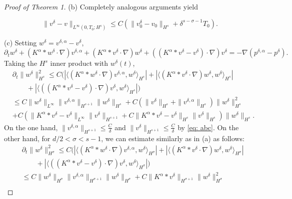 \documentclass{amsart}
\begin{document}
\begin{proof}[Proof of Theorem 1]
(b) Completely analogous arguments yield 

\begin{equation*}
 \|v^{\delta}-v\|_{L^{\infty}(0,T_0;H^s)} \leq C(\|v_0^{\delta}-v_0\|_{H^s}+\delta^{s-\sigma-1}T_0).
\end{equation*}


(c) Setting $w^{\delta}=v^{\delta, \alpha}-v^{\delta}$,
$$ \partial_t w^{\delta} + (K^{\alpha}*w^{\delta} \cdot \nabla) v^{\delta, \alpha} + (K^{\alpha}*v^{\delta} \cdot \nabla) w^{\delta}+  ((K^{\alpha}*v^{\delta}-v^{\delta}) \cdot \nabla) v^{\delta} = -\nabla (p^{\delta,\alpha}-p^{\delta}).$$
Taking the $H^s$ inner product with $w^{\delta}(t)$,
\begin{equation*}
\begin{aligned}
&\partial_t \|w^{\delta} \|_{H^s}^2 \leq C(|\langle (K^{\alpha}*w^{\delta} \cdot \nabla) v^{\delta, \alpha}, w^{\delta}\rangle_{H^s}| + |\langle (K^{\alpha}*v^{\delta} \cdot \nabla) w^{\delta}, w^{\delta}\rangle_{H^s}|\\
&\quad\quad+  |\langle ((K^{\alpha}*v^{\delta}-v^{\delta}) \cdot \nabla) v^{\delta},w^{\delta} \rangle_{H^s}|)\\
&\leq C \|w^{\delta}\|_{L^\infty} \| v^{\delta, \alpha}\|_{H^{s+1}} \|w^{\delta}\|_{H^s} + C(\|v^{\delta}\|_{H^s} + \|v^{\delta,\alpha}\|_{H^s}) \|w^{\delta}\|_{H^s}^2\\ 
&+C(\|K^{\alpha}*v^{\delta}-v^{\delta}\|_{L^\infty} \|v^{\delta}\|_{H^{s+1}} +  C\|K^{\alpha}*v^{\delta}-v^{\delta}\|_{H^s} \|v^{\delta}\|_{H^{s}}) \|w^{\delta}\|_{H^s}. 
\end{aligned}
\end{equation*}
On the one hand, $ \| v^{\delta,\alpha}\|_{H^{s+1}}  \leq \frac{C}{\delta}$ and $ \| v^{\delta}\|_{H^{s+1}} \leq \frac{C}{\delta}$ by \eqref{eq: abc}. On the other hand, for $d/2<\sigma<  s-1$, we can estimate similarly as in (a) as follows:
\begin{equation*}
\begin{aligned}
&\partial_t \|w^{\delta} \|_{H^\sigma}^2 \leq C(|\langle (K^{\alpha}*w^{\delta} \cdot \nabla) v^{\delta, \alpha}, w^{\delta}\rangle_{H^\sigma}| + |\langle (K^{\alpha}*v^{\delta} \cdot \nabla) w^{\delta}, w^{\delta}\rangle_{H^\sigma}|\\
&\quad\quad+  |\langle ((K^{\alpha}*v^{\delta}-v^{\delta}) \cdot \nabla) v^{\delta},w^{\delta} \rangle_{H^\sigma}|)\\
&\leq C \|w^{\delta}\|_{H^\sigma} \| v^{\delta, \alpha}\|_{H^{\sigma+1}} \|w^{\delta}\|_{H^\sigma} + C \|K^\alpha*v^{\delta}\|_{H^{\sigma+1}} \|w^{\delta}\|_{H^\sigma}^2\\ 

\end{aligned}
\end{equation*}
\end{proof}
\end{document}
